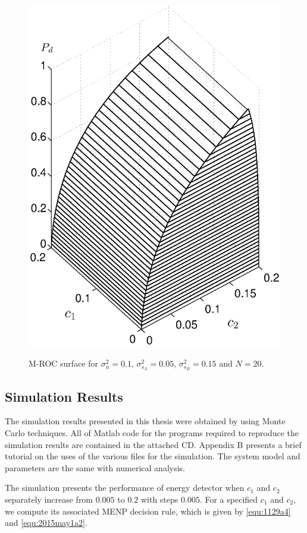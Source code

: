 \begin{figure}[!t]
\centering
\includegraphics[width=12cm, height=16cm]{4/mathc1c2pd.eps}
\caption{M-ROC surface for $\sigma_n^2 = 0.1$, $\sigma_{s_A}^2=0.05$, $\sigma_{s_B}^2=0.15$ and $N = 20$.}
\label{pic:1201a1}
\end{figure}

\subsection{Simulation Results}
The simulation results presented in this thesis were obtained by using Monte Carlo techniques. All of Matlab code for the programs required to reproduce the simulation results are contained in the attached CD. Appendix B presents a brief tutorial on the uses of the various files for the simulation. The system model and parameters are the same with numerical analysis.

The simulation presents the performance of energy detector when $c_1$ and $c_2$ separately increase from $0.005$ to $0.2$ with steps $0.005$. For a specified $c_1$ and $c_2$, we compute  its associated MENP decision rule, which is given by \eqref{equ:1129a4} and \eqref{equ:2015may1a2}. 

